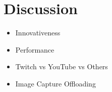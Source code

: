 \section{Discussion}
\begin{itemize}
    \item Innovativeness 
    \item Performance
    \item Twitch vs YouTube vs Others
    \item Image Capture Offloading
\end{itemize}